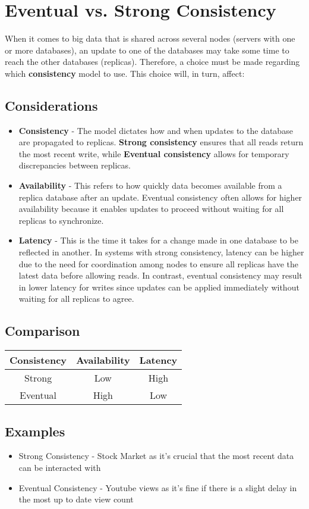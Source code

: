 \chapter{Eventual vs. Strong Consistency}

When it comes to big data that is shared across several nodes (servers with one or more databases), an update to one of the databases may take some time to reach the other databases (replicas). Therefore, a choice must be made regarding which \textbf{consistency} model to use. This choice will, in turn, affect:
\section{Considerations}
\begin{itemize} 
	\item \textbf{Consistency} - The model dictates how and when updates to the database are propagated to replicas. \textbf{Strong consistency} ensures that all reads return the most recent write, while \textbf{Eventual consistency} allows for temporary discrepancies between replicas. 
		\item \textbf{Availability} - This refers to how quickly data becomes available from a replica database after an update. Eventual consistency often allows for higher availability because it enables updates to proceed without waiting for all replicas to synchronize. 
			\item \textbf{Latency} - This is the time it takes for a change made in one database to be reflected in another. In systems with strong consistency, latency can be higher due to the need for coordination among nodes to ensure all replicas have the latest data before allowing reads. In contrast, eventual consistency may result in lower latency for writes since updates can be applied immediately without waiting for all replicas to agree. 
\end{itemize}

\section{Comparison}
\begin{center}
	\begin{tabular}{||c c c||}
		\hline
		Consistency & Availability & Latency\\
		\hline \hline
		Strong & Low & High\\
		\hline
		Eventual & High & Low\\
		\hline
	\end{tabular}
\end{center}

\section{Examples}

\begin{itemize}
	\item{Strong Consistency} - Stock Market as it's crucial that the most recent data can be interacted with
	\item {Eventual Consistency} - Youtube views as it's fine if there is a slight delay in the most up to date view count
\end{itemize}